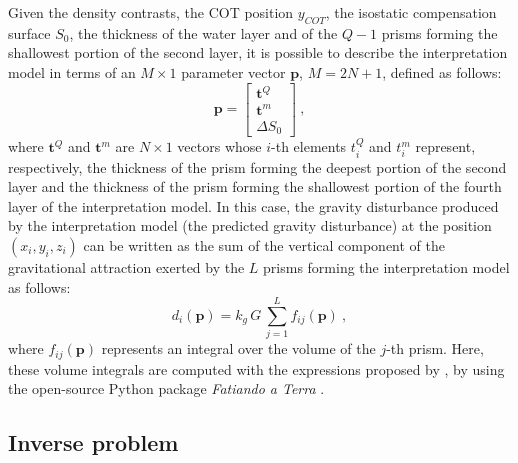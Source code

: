 \documentclass[manuscript]{geophysics}
\begin{document}
Given the density contrasts, the COT position $y_{COT}$, the isostatic compensation
surface $S_{0}$, the thickness of the water layer and of the $Q-1$ prisms forming the
shallowest portion of the second layer, it is possible to describe the interpretation
model in terms of an $M \times 1$ parameter vector $\mathbf{p}$, $M = 2N + 1$, defined
as follows:
\begin{equation}
\mathbf{p} = \begin{bmatrix}
\mathbf{t}^{Q} \\
\mathbf{t}^{m} \\
\Delta S_{0}
\end{bmatrix} \: ,
\label{eq:parameter-vector}
\end{equation}
where $\mathbf{t}^{Q}$ and $\mathbf{t}^{m}$ are $N \times 1$ vectors whose $i$-th
elements $t^{Q}_{i}$ and $t^{m}_{i}$ represent, respectively, the thickness of the
prism forming the deepest portion of the second layer and the thickness of the prism
forming the shallowest portion of the fourth layer of the interpretation model.
In this case, the gravity disturbance produced by the interpretation model (the
predicted gravity disturbance) at the position $(x_{i}, y_{i}, z_{i})$ can be written
as the sum of the vertical component of the gravitational attraction exerted by the $L$
prisms forming the interpretation model as follows:
\begin{equation}
d_{i}(\mathbf{p}) = k_{g} \, G \, \sum_{j = 1}^{L} f_{ij}(\mathbf{p}) \: ,
\label{eq:ith-predicted-data}
\end{equation}
where $f_{ij}(\mathbf{p})$ represents an integral over the volume of the $j$-th 
prism. Here, these volume integrals are computed with the expressions proposed 
by \citet{nagy-etal2000}, by using the open-source Python package 
\textit{Fatiando a Terra} \citep{uieda-etal2013}.


\subsection{Inverse problem}
\end{document}
